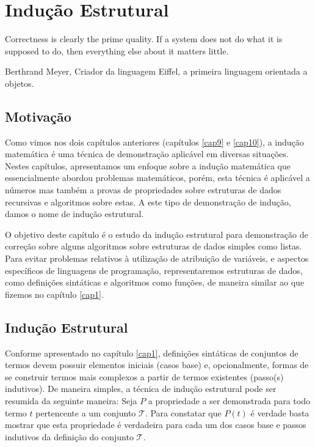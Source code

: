 \chapter{Indução Estrutural}\label{cap11}


\epigraph{Correctness is clearly the prime quality. If a system does
  not do what it is supposed to do, then everything else about it
  matters little.}{Berthrand Meyer, Criador da linguagem Eiffel, a
  primeira linguagem orientada a objetos.}

\section{Motivação}

Como vimos nos dois capítulos anteriores (capítulos \ref{cap9} e
\ref{cap10}), a indução matemática é uma técnica de demonstração
aplicável em diversas situações. Nestes capítulos, apresentamos um
enfoque sobre a indução matemática que essencialmente abordou
problemas matemáticos, porém, esta técnica é aplicável a números mas
também a provas de propriedades sobre estruturas de dados recursivas e
algoritmos sobre estas. A este tipo de demonstração de indução, damos
o nome de indução estrutural.

O objetivo deste capítulo é o estudo da indução estrutural para
demonstração de correção sobre alguns algoritmos sobre
estruturas de dados simples como listas. Para
evitar problemas relativos à utilização de atribuição de variáveis, e
aspectos específicos de linguagens de programação,
representaremos estruturas de dados, como definições sintáticas e
algoritmos como funções, de maneira similar ao que fizemos no capítulo
\ref{cap1}.

\section{Indução Estrutural}

Conforme apresentado no capítulo \ref{cap1}, definições sintáticas de
conjuntos de termos devem possuir elementos iniciais (casos base) e,
opcionalmente, formas de se construir termos mais complexos a
partir de termos existentes (passo(s) indutivos).
De maneira simples, a técnica de indução estrutural pode ser resumida
da seguinte maneira: Seja $P$ a propriedade a ser demonstrada para
todo termo $t$ pertencente a um conjunto $\mathcal{T}$. Para constatar
que $P(t)$ é verdade basta mostrar que esta propriedade é verdadeira
para cada um dos casos base e passos indutivos da definição do
conjunto $\mathcal{T}$.

